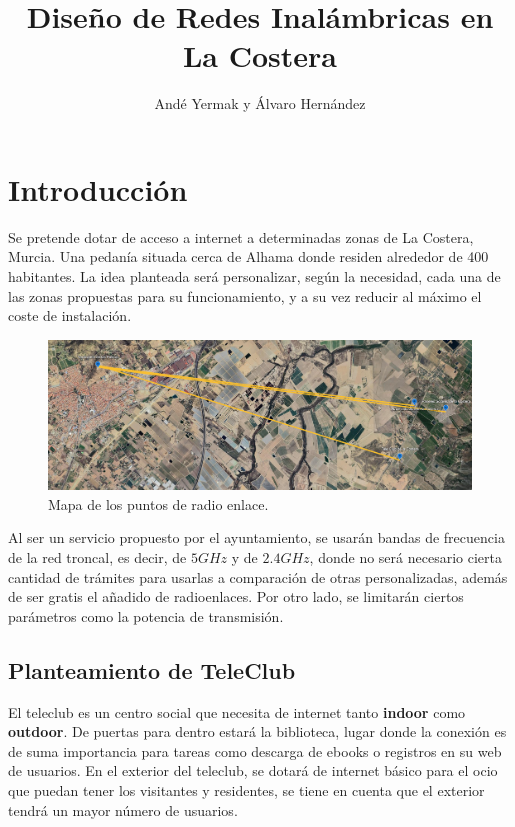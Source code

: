 \documentclass{article}
\title{Diseño de Redes Inalámbricas en La Costera}
\author{Andé Yermak y Álvaro Hernández}
\begin{document}
\maketitle

\tableofcontents
\newpage

\section{Introducción}

Se pretende dotar de acceso a internet a determinadas zonas de La Costera, Murcia. Una pedanía situada cerca de Alhama donde residen alrededor de 400 habitantes. La idea planteada será personalizar, según la necesidad, cada una de las zonas propuestas para su funcionamiento, y a su vez reducir al máximo el coste de instalación.

\begin{figure}[ht]
    \centering
    \includegraphics[width=0.8
    \linewidth]{src/earthpoints.png}
    \caption{\label{fig:earthpoints} Mapa de los puntos de radio enlace.}
\end{figure}

\quad

Al ser un servicio propuesto por el ayuntamiento, se usarán bandas de frecuencia de la red troncal, es decir, de $5GHz$ y de $2.4GHz$, donde no será necesario cierta cantidad de trámites para usarlas a comparación de otras personalizadas, además de ser gratis el añadido de radioenlaces. Por otro lado, se limitarán ciertos parámetros como la potencia de transmisión.

\subsection{Planteamiento de TeleClub}

El teleclub es un centro social que necesita de internet tanto \textbf{indoor} como \textbf{outdoor}. De puertas para dentro estará la biblioteca, lugar donde la conexión es de suma importancia para tareas como descarga de ebooks o registros en su web de usuarios. En el exterior del teleclub, se dotará de internet básico para el ocio que puedan tener los visitantes y residentes, se tiene en cuenta que el exterior tendrá un mayor número de usuarios.
\end{document}
